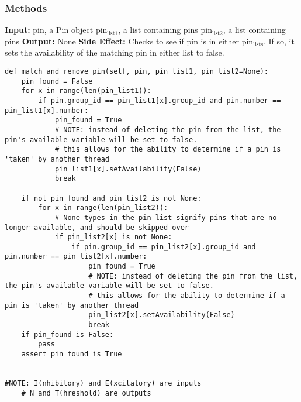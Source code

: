 \documentclass[a4paper]{article}
\begin{document}
\subsubsection{Methods}
\label{sec-4-3-1}
\textbf{Input:} pin, a Pin object
    pin$_{\text{list1}}$, a list containing pins
    pin$_{\text{list2}}$, a list containing pins
\textbf{Output:} None
\textbf{Side Effect:} Checks to see if pin is in either pin$_{\text{lists}}$. If so, it sets the availability of the matching pin in either list to false.

\begin{verbatim}
def match_and_remove_pin(self, pin, pin_list1, pin_list2=None):
    pin_found = False
    for x in range(len(pin_list1)):
        if pin.group_id == pin_list1[x].group_id and pin.number == pin_list1[x].number:
            pin_found = True
            # NOTE: instead of deleting the pin from the list, the pin's available variable will be set to false.
            # this allows for the ability to determine if a pin is 'taken' by another thread
            pin_list1[x].setAvailability(False)
            break

    if not pin_found and pin_list2 is not None:
        for x in range(len(pin_list2)):
            # None types in the pin list signify pins that are no longer available, and should be skipped over
            if pin_list2[x] is not None:
                if pin.group_id == pin_list2[x].group_id and pin.number == pin_list2[x].number:
                    pin_found = True
                    # NOTE: instead of deleting the pin from the list, the pin's available variable will be set to false.
                    # this allows for the ability to determine if a pin is 'taken' by another thread
                    pin_list2[x].setAvailability(False)
                    break
    if pin_found is False:
        pass
    assert pin_found is True


#NOTE: I(nhibitory) and E(xcitatory) are inputs
    # N and T(hreshold) are outputs
\end{verbatim}
\end{document}
